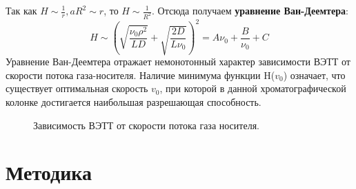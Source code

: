 \documentclass[12pt]{article}
\begin{document}
\begin{flushleft}
Так как $H \sim \frac{1}{r}, a R^2 \sim r$, то $H \sim \frac{1}{R^2}$. Отсюда получаем \textbf{уравнение Ван-Деемтера}:
\begin{equation}
H \sim \left(\sqrt{\frac{\nu_0\rho^2}{LD}} + \sqrt{\frac{2D}{L\nu_0}}\right)^2 = A\nu_0 + \frac{B}{\nu_0} + C
\end{equation}
Уравнение Ван-Деемтера отражает немонотонный характер зависимости
ВЭТТ от скорости потока газа-носителя. Наличие минимума функции H($v_0$) означает, что существует оптимальная скорость $v_0$, при которой в данной
хроматографической колонке достигается наибольшая разрешающая способность.
\begin{figure}[!h]
\caption{Зависимость ВЭТТ от скорости
потока газа носителя.}
\label{ris:image}
\end{figure}
\section{Методика}

\end{flushleft}
\end{document}
